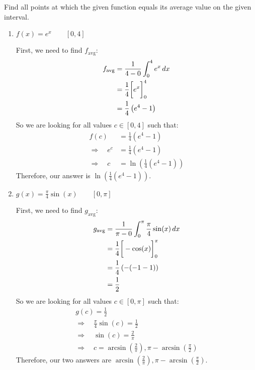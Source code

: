 \documentclass[handout,nooutcomes]{ximera}
\begin{document}
	
	
	
			
			

\begin{problem}

Find all points at which the given function equals its average value on the given interval.
	\begin{enumerate}
	
	\item  $f(x) = e^x	\qquad	[0,4]$
		\begin{freeResponse}
		First, we need to find $f_{\text{avg}}$:
			\begin{align*}
			f_{\text{avg}} &= \frac{1}{4-0} \int_0^4 e^x \,d x  \\
			&= \frac{1}{4} \bigg[ e^x \bigg]_0^4  \\
			&= \frac{1}{4} \left( e^4 - 1 \right)  
			\end{align*}
		So we are looking for all values $c \in [0,4]$ such that:
			\begin{align*}
			f(c) &= \frac{1}{4} (e^4 - 1)  \\
			\Longrightarrow \quad e^c &= \frac{1}{4} (e^4 - 1)  \\
			\Longrightarrow \quad c &= \ln \left( \frac{1}{4} (e^4 - 1) \right)
			\end{align*}
		Therefore, our answer is $\ln \left( \frac{1}{4} (e^4 - 1) \right)$.
		\end{freeResponse}
		
		
		
	\item  $g(x) = \frac{\pi}{4} \sin(x)	\qquad	[0,\pi]$
		\begin{freeResponse}
		First, we need to find $g_{\text{avg}}$:
			\begin{align*}
			g_{\text{avg}} &= \frac{1}{\pi-0} \int_0^{\pi} \frac{\pi}{4} \sin(x) \,d x  \\
			&= \frac{1}{4} \bigg[ -\cos(x) \bigg]_0^{\pi}  \\
			&= \frac{1}{4} \left( - (-1-1) \right)  \\
			&= \frac{1}{2}
			\end{align*}
		So we are looking for all values $c \in [0,\pi]$ such that:
			\begin{align*}
			&g(c) = \frac{1}{2}  \\
			&\Longrightarrow \quad \frac{\pi}{4} \sin(c) = \frac{1}{2}  \\
			&\Longrightarrow \quad \sin(c) = \frac{2}{\pi}  \\
			&\Longrightarrow \quad c = \arcsin \left( \frac{2}{\pi} \right), \pi - \arcsin \left( \frac{\pi}{2} \right)
			&\end{align*}
		Therefore, our two answers are $\arcsin \left( \frac{2}{\pi} \right), \pi - \arcsin \left( \frac{\pi}{2} \right)$.
		\end{freeResponse}
		
		
		
	\end{enumerate}
			
			
		
\end{problem}
\end{document}
